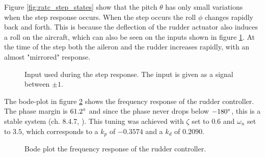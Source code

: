 Figure \ref{fig:ratc_step_states} show that the pitch $\theta$ has only small variations when the step response occurs. When the step occurs the roll $\phi$ changes rapidly back and forth. This is because the deflection of the rudder actuator also induces a roll on the aircraft, which can also be seen on the inputs shown in figure \ref{fig:ratc_step_input}. At the time of the step both the aileron and the rudder increases rapidly, with an almost "mirrored" response.

\begin{figure}[]
    \centering
    \caption{Input used during the step response. The input is given as a signal between $\pm1$.}
	\label{fig:ratc_step_input}
\end{figure}

The bode-plot in figure \ref{fig:ratc_bode} shows the frequency response of the rudder controller. The phase margin is $61.2\degree$ and since the phase never drops below $-180\degree$, this is a stable system (ch. 8.4.7, \cite{regBALCHEN}). This tuning was achieved with $\zeta$ set to $0.6$ and $\omega_n$ set to $3.5$, which corresponds to a $k_p$ of $-0.3574$ and a $k_d$ of $0.2090$.

\begin{figure}[]
    \centering
    \caption{Bode plot the frequency response of the rudder controller.}
	\label{fig:ratc_bode}
\end{figure}


